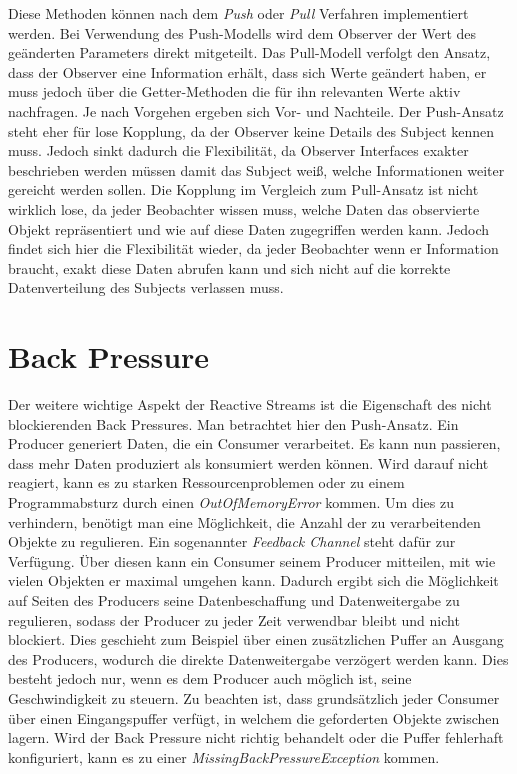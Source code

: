 Diese Methoden können nach dem \textit{Push} oder \textit{Pull} Verfahren implementiert werden. Bei Verwendung des Push-Modells wird dem Observer der Wert des geänderten Parameters direkt mitgeteilt. Das Pull-Modell verfolgt den Ansatz, dass der Observer eine Information erhält, dass sich Werte geändert haben, er muss jedoch über die Getter-Methoden die für ihn relevanten Werte aktiv nachfragen. Je nach Vorgehen ergeben sich Vor- und Nachteile. Der Push-Ansatz steht eher für lose Kopplung, da der Observer keine Details des Subject kennen muss. Jedoch sinkt dadurch die Flexibilität, da Observer Interfaces exakter beschrieben werden müssen damit das Subject weiß, welche Informationen weiter gereicht werden sollen. Die Kopplung im Vergleich zum Pull-Ansatz ist nicht wirklich lose, da jeder Beobachter wissen muss, welche Daten das observierte Objekt repräsentiert und wie auf diese Daten zugegriffen werden kann. Jedoch findet sich hier die Flexibilität wieder, da jeder Beobachter wenn er Information braucht, exakt diese Daten abrufen kann und sich nicht auf die korrekte Datenverteilung des Subjects verlassen muss.
\section{Back Pressure}
Der weitere wichtige Aspekt der Reactive Streams ist die Eigenschaft des nicht blockierenden Back Pressures. Man betrachtet hier den Push-Ansatz. Ein Producer generiert Daten, die ein Consumer verarbeitet. Es kann nun passieren, dass mehr Daten produziert als konsumiert werden können. Wird darauf nicht reagiert, kann es zu starken Ressourcenproblemen oder zu einem Programmabsturz durch einen \textit{OutOfMemoryError} kommen. Um dies zu verhindern, benötigt man eine Möglichkeit, die Anzahl der zu verarbeitenden Objekte zu regulieren. Ein sogenannter \textit{Feedback Channel} steht dafür zur Verfügung. Über diesen kann ein Consumer seinem Producer mitteilen, mit wie vielen Objekten er maximal umgehen kann. Dadurch ergibt sich die Möglichkeit auf Seiten des Producers seine Datenbeschaffung und Datenweitergabe zu regulieren, sodass der Producer zu jeder Zeit verwendbar bleibt und nicht blockiert. Dies geschieht zum Beispiel über einen zusätzlichen Puffer an Ausgang des Producers, wodurch die direkte Datenweitergabe verzögert werden kann. Dies besteht jedoch nur, wenn es dem Producer auch möglich ist, seine Geschwindigkeit zu steuern. Zu beachten ist, dass grundsätzlich jeder Consumer über einen Eingangspuffer verfügt, in welchem die geforderten Objekte zwischen lagern. Wird der Back Pressure nicht richtig behandelt oder die Puffer fehlerhaft konfiguriert, kann es zu einer \textit{MissingBackPressureException} kommen.
